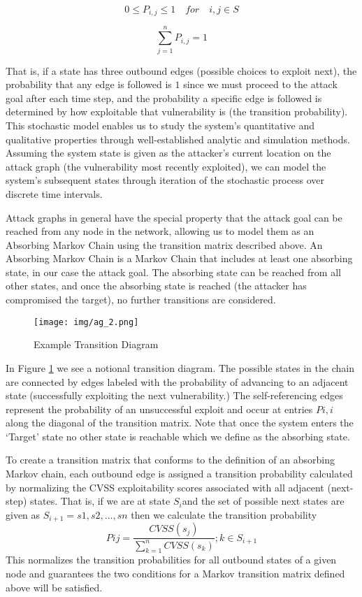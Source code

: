 \[0 \leq P_{i,j} \leq 1\quad for\quad i,j \in S\]

\[\sum_{j=1}^{n} P_{i,j} = 1\]

That is, if a state has three outbound edges (possible choices to exploit next), the probability that any edge is followed is \(1\) since we must proceed to the attack goal after each time step, and the probability a specific edge is followed is determined by how exploitable that vulnerability is (the transition probability). This stochastic model enables us to study the system’s quantitative and qualitative properties through well-established analytic and simulation methods. Assuming the system state is given as the attacker’s current location on the attack graph (the vulnerability most recently exploited), we can model the system’s subsequent states through iteration of the stochastic process over discrete time intervals.  

 

Attack graphs in general have the special property that the attack goal can be reached from any node in the network, allowing us to model them as an Absorbing Markov Chain using the transition matrix described above. An Absorbing Markov Chain is a Markov Chain that includes at least one absorbing state, in our case the attack goal. The absorbing state can be reached from all other states, and once the absorbing state is reached (the attacker has compromised the target), no further transitions are considered.  

\begin{figure}[H]
\centering
\texttt{[image: img/ag\_2.png]}
\caption{Example Transition Diagram}
\label{fig:ag_2}
\end{figure} 

In Figure \ref{fig:ag_2} we see a  notional transition diagram. The possible states in the chain are connected by edges labeled with the probability of advancing to an adjacent state (successfully exploiting the next vulnerability.) The self-referencing edges represent the probability of an unsuccessful exploit and occur at entries \(Pi,i\) along the diagonal of the transition matrix. Note that once the system enters the ‘Target’ state no other state is reachable which we define as the absorbing state.  

 

To create a transition matrix that conforms to the definition of an absorbing Markov chain, each outbound edge is assigned a transition probability calculated by normalizing the CVSS exploitability scores associated with all adjacent (next-step) states. That is, if we are at state \(S_i \)and the set of possible next states are given as \(S_{i+1} = {s1, s2, \ldots, sn}\) then we calculate the transition probability
\[ Pij =\frac{CVSS(s_j)}{\sum_{k=1}^{n}CVSS(s_k)}; k \in S_{i+1}\]
This normalizes the transition probabilities for all outbound states of a given node and guarantees the two conditions for a Markov transition matrix defined above will be satisfied.  

